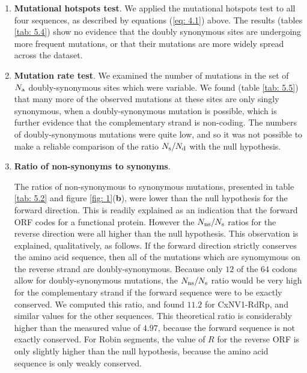\documentclass[unnumsec,webpdf,contemporary,large]{oup-authoring-template}%
\theoremstyle{thmstyleone}%
\theoremstyle{thmstyletwo}%
\theoremstyle{thmstylethree}%
\begin{document}
\begin{enumerate}

\item{\bf Mutational hotspots test}. We applied the mutational hotspots test to all four sequences,
as described by equations (\ref{eq: 4.1}) above.
The results (tables \ref{tab: 5.4}) show no evidence that the doubly synonymous sites are
undergoing more frequent mutations, or that their mutations are more widely spread across the dataset.

\item{\bf Mutation rate test}. We examined the number of mutations in the set
of $N_{\rm a}$ doubly-synonymous sites which were variable. We found (table \ref{tab: 5.5})
that many more of the observed mutations at these sites are only singly synonymous, when
a doubly-synonymous mutation is possible, which is further evidence that the complementary
strand is non-coding. The numbers of doubly-synonymous mutations
were quite low, and so it was not possible to make a reliable comparison of the
ratio $N_{\rm s}/N_{\rm d}$ with the null hypothesis.

\item{\bf Ratio of non-synonyms to synonyms}.

The ratios of non-synonymous to synonymous mutations, presented in table \ref{tab: 5.2}
and figure \ref{fig: 1}({\bf b}), were
lower than the null hypothesis for the forward direction. This is readily explained as an indication
that the forward ORF codes for a functional protein. However the $N_{\rm ns}/N_{\rm s}$
ratios for the reverse direction were all higher than the null hypothesis. This observation
is explained, qualitatively, as follows.
If the forward direction strictly conserves the amino acid sequence, then all of the mutations
which are synomymous on the reverse strand are doubly-synonymous. Because only
$12$ of the $64$ codons allow for doubly-synonymous mutations, the $N_{\rm ns}/N_{\rm s}$
ratio would be very high for the complementary strand if the forward sequence were to be exactly conserved.
We computed this ratio, and found $11.2$ for CxNV1-RdRp, and similar values for the other sequences.
This theoretical ratio is considerably higher than the measured value of $4.97$, because the
forward sequence is not exactly conserved. For Robin segments, the value of $R$ for the reverse
ORF is only slightly higher than the null hypothesis, because the amino acid sequence is only weakly
conserved.

\end{enumerate}
\end{document}

